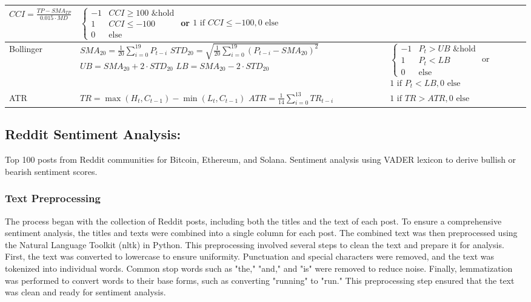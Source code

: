 \begin{tabular}{|>{\raggedright\arraybackslash}m{2cm}|>{\raggedright\arraybackslash}m{10cm}|>{\raggedright\arraybackslash}m{5cm}|}
$CCI = \frac{TP - SMA_{TP}}{0.015 \cdot MD}$ & $\begin{cases}
-1 & CCI \geq 100 \text{ \& hold} \\
1 & CCI \leq -100 \\
0 & \text{else}
\end{cases}$ \newline
or \newline
$1 \text{ if } CCI \leq -100, 0 \text{ else}$ \\
\hline
Bollinger & $SMA_{20} = \frac{1}{20} \sum_{i=0}^{19} P_{t-i}$ \newline
$STD_{20} = \sqrt{\frac{1}{20} \sum_{i=0}^{19} (P_{t-i} - SMA_{20})^2}$ \newline
$UB = SMA_{20} + 2 \cdot STD_{20}$ \newline
$LB = SMA_{20} - 2 \cdot STD_{20}$ & $\begin{cases}
-1 & P_t > UB \text{ \& hold} \\
1 & P_t < LB \\
0 & \text{else}
\end{cases}$ \newline
or \newline
$1 \text{ if } P_t < LB, 0 \text{ else}$ \\
\hline
ATR & $TR = \max(H_t, C_{t-1}) - \min(L_t, C_{t-1})$ \newline
$ATR = \frac{1}{14} \sum_{i=0}^{13} TR_{t-i}$ & $1 \text{ if } TR > ATR, 0 \text{ else}$ \\
\hline
\end{tabular}



\subsection{Reddit Sentiment Analysis:} Top 100 posts from Reddit communities for Bitcoin, Ethereum, and Solana. Sentiment analysis using VADER lexicon to derive bullish or bearish sentiment scores.

\subsubsection{Text Preprocessing}
The process began with the collection of Reddit posts, including both the titles and the text of each post. To ensure a comprehensive sentiment analysis, the titles and texts were combined into a single column for each post. The combined text was then preprocessed using the Natural Language Toolkit (nltk) in Python. This preprocessing involved several steps to clean the text and prepare it for analysis. First, the text was converted to lowercase to ensure uniformity. Punctuation and special characters were removed, and the text was tokenized into individual words. Common stop words such as "the," "and," and "is" were removed to reduce noise. Finally, lemmatization was performed to convert words to their base forms, such as converting "running" to "run." This preprocessing step ensured that the text was clean and ready for sentiment analysis.

